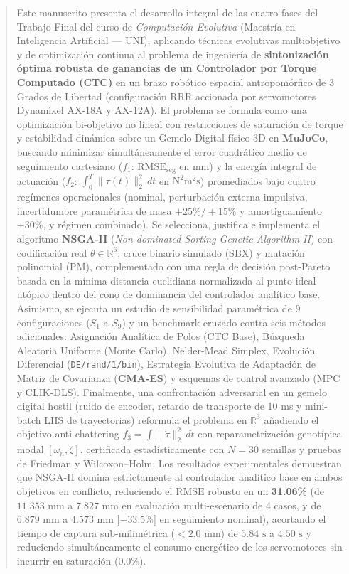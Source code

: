 \documentclass[11pt,a4paper]{article}
\begin{document}
\tableofcontents
\newpage

\begin{abstract}
\noindent Este manuscrito presenta el desarrollo integral de las cuatro fases del Trabajo Final del curso de \textit{Computación Evolutiva} (Maestría en Inteligencia Artificial — UNI), aplicando técnicas evolutivas multiobjetivo y de optimización continua al problema de ingeniería de \textbf{sintonización óptima robusta de ganancias de un Controlador por Torque Computado (CTC)} en un brazo robótico espacial antropomórfico de 3 Grados de Libertad (configuración RRR accionada por servomotores Dynamixel AX-18A y AX-12A). El problema se formula como una optimización bi-objetivo no lineal con restricciones de saturación de torque y estabilidad dinámica sobre un Gemelo Digital físico 3D en \textbf{MuJoCo}, buscando minimizar simultáneamente el error cuadrático medio de seguimiento cartesiano ($f_1$: $\text{RMSE}_{\text{seg}}$ en mm) y la energía integral de actuación ($f_2$: $\int_0^T \|\tau(t)\|_2^2\,dt$ en $\text{N}^2\text{m}^2\text{s}$) promediados bajo cuatro regímenes operacionales (nominal, perturbación externa impulsiva, incertidumbre paramétrica de masa $+25\%/+15\%$ y amortiguamiento $+30\%$, y régimen combinado). Se selecciona, justifica e implementa el algoritmo \textbf{NSGA-II} (\textit{Non-dominated Sorting Genetic Algorithm II}) con codificación real $\theta \in \mathbb{R}^6$, cruce binario simulado (SBX) y mutación polinomial (PM), complementado con una regla de decisión post-Pareto basada en la mínima distancia euclidiana normalizada al punto ideal utópico dentro del cono de dominancia del controlador analítico base. Asimismo, se ejecuta un estudio de sensibilidad paramétrica de 9 configuraciones ($S_1$ a $S_9$) y un benchmark cruzado contra seis métodos adicionales: Asignación Analítica de Polos (CTC Base), Búsqueda Aleatoria Uniforme (Monte Carlo), Nelder-Mead Simplex, Evolución Diferencial (\texttt{DE/rand/1/bin}), Estrategia Evolutiva de Adaptación de Matriz de Covarianza (\textbf{CMA-ES}) y esquemas de control avanzado (MPC y CLIK-DLS). Finalmente, una confrontación adversarial en un gemelo digital hostil (ruido de encoder, retardo de transporte de 10 ms y mini-batch LHS de trayectorias) reformula el problema en $\mathbb{R}^3$ añadiendo el objetivo anti-chattering $f_3=\int\|\dot{\tau}\|_2^2\,dt$ con reparametrización genotípica modal $[\omega_n,\zeta]$, certificada estadísticamente con $N=30$ semillas y pruebas de Friedman y Wilcoxon--Holm. Los resultados experimentales demuestran que NSGA-II domina estrictamente al controlador analítico base en ambos objetivos en conflicto, reduciendo el $\text{RMSE}$ robusto en un \textbf{31.06\%} (de $11.353\text{ mm}$ a $7.827\text{ mm}$ en evaluación multi-escenario de 4 casos, y de $6.879\text{ mm}$ a $4.573\text{ mm}$ [$-33.5\%$] en seguimiento nominal), acortando el tiempo de captura sub-milimétrica ($<2.0\text{ mm}$) de $5.84\text{ s}$ a $4.50\text{ s}$ y reduciendo simultáneamente el consumo energético de los servomotores sin incurrir en saturación ($0.0\%$).
\end{abstract}
\end{document}
